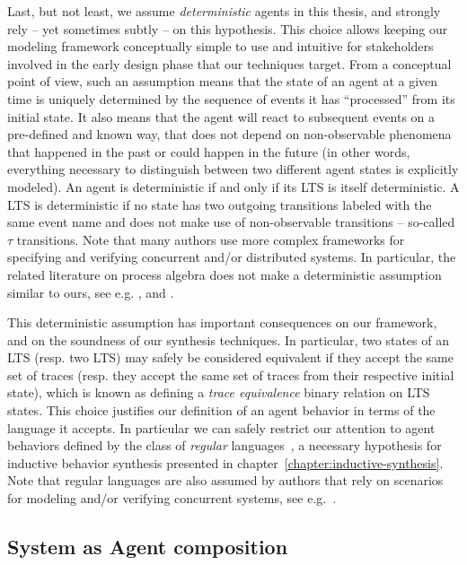 Last, but not least, we assume \emph{deterministic} agents in this thesis, and strongly rely -- yet sometimes subtly -- on this hypothesis. This choice allows keeping our modeling framework conceptually simple to use and intuitive for stakeholders involved in the early design phase that our techniques target. From a conceptual point of view, such an assumption means that the state of an agent at a given time is uniquely determined by the sequence of events it has ``processed'' from its initial state. It also means that the agent will react to subsequent events on a pre-defined and known way, that does not depend on non-observable phenomena that happened in the past or could happen in the future (in other words, everything necessary to distinguish between two different agent states is explicitly modeled). An agent is deterministic if and only if its LTS is itself deterministic. A LTS is deterministic if no state has two outgoing transitions labeled with the same event name and does not make use of non-observable transitions -- so-called $\tau$ transitions. Note that many authors use more complex frameworks for specifying and verifying concurrent and/or distributed systems. In particular, the related literature on process algebra does not make a deterministic assumption similar to ours, see e.g. \cite{Hoare:1985}, \cite{Milner:1989} and \cite{Magee:1999}.

This deterministic assumption has important consequences on our framework, and on the soundness of our synthesis techniques. In particular, two states of an LTS (resp. two LTS) may safely be considered equivalent if they accept the same set of traces (resp. they accept the same set of traces from their respective initial state), which is known as defining a \emph{trace equivalence} binary relation on LTS states. This choice justifies our definition of an agent behavior in terms of the language it accepts. In particular we can safely restrict our attention to agent behaviors defined by the class of \emph{regular} languages~\cite{Hopcroft:1979}, a necessary hypothesis for inductive behavior synthesis presented in chapter~\ref{chapter:inductive-synthesis}. Note that regular languages are also assumed by authors that rely on scenarios for modeling and/or verifying concurrent systems, see e.g.~\cite{Alur:1999, Uchitel:2003, Uchitel:2004}.

\subsection{System as Agent composition}

